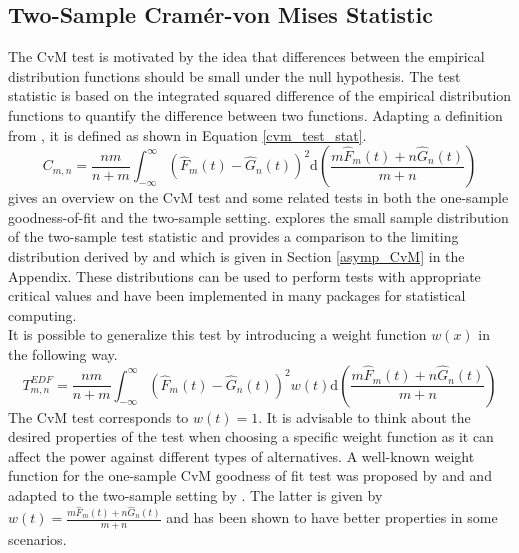 \documentclass[12pt, a4paper]{article}
\theoremstyle{MAstyle} \newtheorem{assumption}{Assumption}[section]
\theoremstyle{MAstyle} \newtheorem{definition}{Definition}[section]
\theoremstyle{MAstyle} \newtheorem{theorem}{Theorem}[section]
\begin{document}
		\subsection{Two-Sample Cram\'{e}r-von Mises Statistic}\label{Two_sample_CvM}
			The CvM test is motivated by the idea that differences between the empirical distribution functions should be small under the null hypothesis. The test statistic is based on the integrated squared difference of the empirical distribution functions to quantify the difference between two functions.
			Adapting a definition from \cite{buning_nichtparametrische_2013}, it is defined as shown in Equation \ref{cvm_test_stat}.
			\begin{equation}\label{cvm_test_stat}
				C_{m,n} = \frac{nm}{n+m} \int_{-\infty}^{\infty}\left(\hat{F}_{m}(t) - \hat{G}_{n}(t)\right)^{2} \mathrm{d} \left(\frac{m \hat{F}_{m}(t) + n \hat{G}_{n}(t)}{m+n}\right) 
			\end{equation}
			\cite{darling_kolmogorov-smirnov_1957} gives an overview on the CvM test and some related tests in both the one-sample goodness-of-fit and the two-sample setting. \cite{anderson_distribution_1962} explores the small sample distribution of the two-sample test statistic and provides a comparison to the limiting distribution derived by \cite{rosenblatt_limit_1952} and \cite{fisz_result_1960} which is given in Section \ref{asymp_CvM} in the Appendix. These distributions can be used to perform tests with appropriate critical values and have been implemented in many packages for statistical computing.\\
			
			It is possible to generalize this test by introducing a weight function $w(x)$ in the following way. 
			\begin{equation}
				T^{\textit{EDF}}_{m,n} = \frac{nm}{n+m} \int_{-\infty}^{\infty}\left(\hat{F}_{m}(t) - \hat{G}_{n}(t)\right)^{2} w(t) \mathrm{d} \left(\frac{m \hat{F}_{m}(t) + n \hat{G}_{n}(t)}{m+n}\right)
			\end{equation}
			The CvM test corresponds to $w(t) = 1$. It is advisable to think about the desired properties of the test when choosing a specific weight function as it can affect the power against different types of alternatives. A well-known weight function for the one-sample CvM goodness of fit test was proposed by \cite{anderson_asymptotic_1952} and \cite{anderson_test_1954} and adapted to the two-sample setting by \cite{pettitt_two-sample_1976}. The latter is given by $w(t) = \frac{m \hat{F}_m(t) + n \hat{G}_n(t)}{m+n}$ and has been shown to have better properties in some scenarios.					
			
\end{document}
